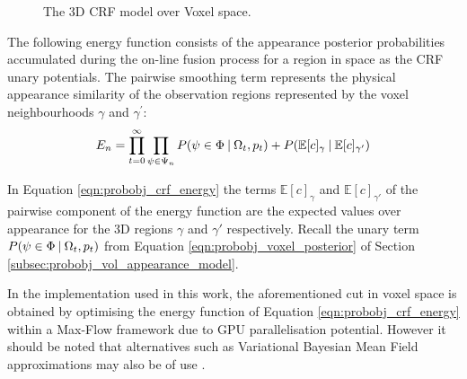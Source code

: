 \begin{figure}[h]
{
  }
  \caption[3D CRF over Voxels]
  {The 3D CRF model over Voxel space.}
\end{figure}

The following energy function consists of the appearance posterior probabilities
accumulated during the on-line fusion process for a region in space as the
CRF unary potentials. The pairwise smoothing term represents the physical
appearance similarity of the observation regions represented by the
voxel neighbourhoods $\gamma$ and $\gamma^{'}$:
\begin{equation}
  \label{eqn:probobj_crf_energy}
  E_{n} = \prod_{t=0}^{\infty} \prod_{\psi \in \Psi_{n}}
  P(\psi \in \Phi \:\vert\: \Omega_{t}, p_{t}) +
  P(\mathbb{E}[c]_{\gamma} \:\vert\: \mathbb{E}[c]_{\gamma'})
\end{equation}

In Equation \ref{eqn:probobj_crf_energy} the terms $\mathbb{E}[c]_{\gamma}$ and
$\mathbb{E}[c]_{\gamma'}$ of the pairwise component of the energy function are
the expected values over appearance for the 3D regions $\gamma$ and $\gamma'$
respectively. Recall the unary term $P(\psi \in \Phi \:\vert\: \Omega_{t}, p_{t})$
from Equation \ref{eqn:probobj_voxel_posterior} of Section
\ref{subsec:probobj_vol_appearance_model}.

In the implementation used in this work, the aforementioned cut in voxel space
is obtained by optimising the energy function of Equation \ref{eqn:probobj_crf_energy} 
within a Max-Flow framework \cite{BOYKOV} due to GPU parallelisation potential. However 
it should be noted that alternatives such as Variational Bayesian Mean Field approximations 
may also be of use \cite{KRAHENBUHL}.

